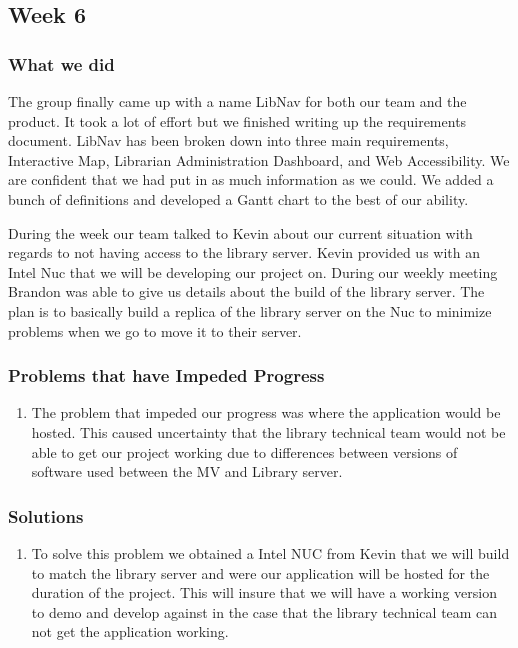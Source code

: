 \documentclass[letterpaper,10pt,titlepage, onecolumn, compsoc]{IEEEtran}
\begin{document}
\subsection{Week 6}

\subsubsection{What we did}
The group finally came up with a name LibNav for both our team and the product. It took a lot of effort but we finished writing up the requirements document. LibNav has been broken down into three main requirements, Interactive Map, Librarian Administration Dashboard, and Web Accessibility. We are confident that we had put in as much information as we could. We added a bunch of definitions and developed a Gantt chart to the best of our ability. 

During the week our team talked to Kevin about our current situation with regards to not having access to the library server. Kevin provided us with an Intel Nuc that we will be developing our project on. During our weekly meeting Brandon was able to give us details about the build of the library server. The plan is to basically build a replica of the library server on the Nuc to minimize problems when we go to move it to their server. 

\subsubsection{Problems that have Impeded Progress}
\begin{enumerate}
	\item The problem that impeded our progress was where the application would be hosted. This caused uncertainty that the library technical team would not be able to get our project working due to differences between versions of software used between the MV and Library server. 
\end{enumerate}

\subsubsection{Solutions}
\begin{enumerate}
	\item To solve this problem we obtained a Intel NUC from Kevin that we will build to match the library server and were our application will be hosted for the duration of the project. This will insure that we will have a working version to demo and develop against in the case that the library technical team can not get the application working.  
\end{enumerate}
\end{document}
